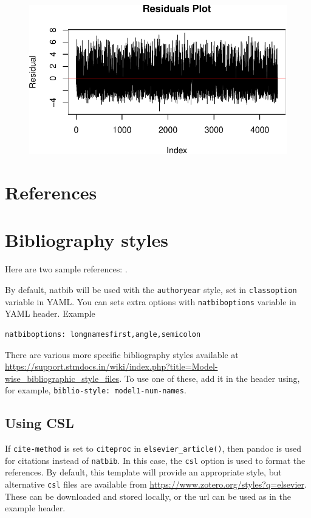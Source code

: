 \documentclass[
  super,
  preprint,
  3p]{elsarticle}
\begin{document}
\begin{figure}[H]

{\centering \includegraphics{project_report_files/figure-pdf/unnamed-chunk-22-1.pdf}

}

\end{figure}

\hypertarget{references}{%
\section*{References}\label{references}}

\hypertarget{bibliography-styles}{%
\section{Bibliography styles}\label{bibliography-styles}}

Here are two sample references: \citet{Feynman1963118}
\citet{Dirac1953888}.

By default, natbib will be used with the \texttt{authoryear} style, set
in \texttt{classoption} variable in YAML. You can sets extra options
with \texttt{natbiboptions} variable in YAML header. Example

\begin{verbatim}
natbiboptions: longnamesfirst,angle,semicolon
\end{verbatim}

There are various more specific bibliography styles available at
\url{https://support.stmdocs.in/wiki/index.php?title=Model-wise_bibliographic_style_files}.
To use one of these, add it in the header using, for example,
\texttt{biblio-style:\ model1-num-names}.

\hypertarget{using-csl}{%
\subsection{Using CSL}\label{using-csl}}

If \texttt{cite-method} is set to \texttt{citeproc} in
\texttt{elsevier\_article()}, then pandoc is used for citations instead
of \texttt{natbib}. In this case, the \texttt{csl} option is used to
format the references. By default, this template will provide an
appropriate style, but alternative \texttt{csl} files are available from
\url{https://www.zotero.org/styles?q=elsevier}. These can be downloaded
and stored locally, or the url can be used as in the example header.


  
\end{document}
